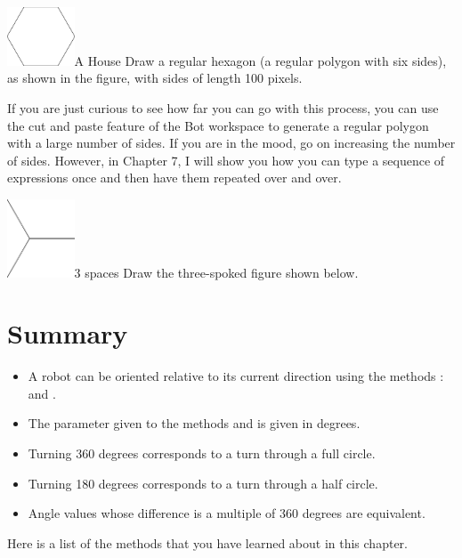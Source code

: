 \documentclass[a4paper,10pt,twoside]{book}
\begin{document}
\begin{exofigwithsize}[0.5]{\includegraphics[width=2cm]{ChTurnhexagon}}{A House}\label{xp:hexagon}
	Draw a regular hexagon (a regular polygon with six sides), as shown in the figure, with sides of length 100 pixels.
\end{exofigwithsize}

If you are just curious to see how far you can go with this process, you can use the cut and 
paste feature of the Bot workspace to generate a regular polygon with a large number of sides. 
If you are in the mood, go on increasing the number of sides. However, in Chapter 7, I will show 
you how you can type a sequence of expressions once and then have them repeated over and 
over. 

\begin{exofigwithsize}[0.5]{\includegraphics[width=2cm]{ChTurnc3pace}}{3 spaces}\label{xp:threespokedfig}
Draw the three-spoked figure shown below. 
\end{exofigwithsize}


\section{Summary}

\begin{itemize}
\item A robot can be oriented relative to its current direction using the methods : 
and . 
\item The parameter given to the methods  and  is given in degrees. 
\item Turning 360 degrees corresponds to a turn through a full circle. 
\item  Turning 180 degrees corresponds to a turn through a half circle. 
\item Angle values whose difference is a multiple of 360 degrees are equivalent. 
\end{itemize}

Here is a list of the methods that you have learned about in this chapter. 
\end{document}
